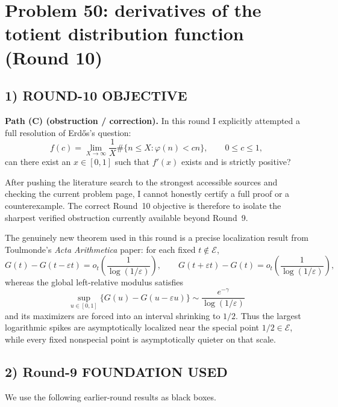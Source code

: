 \section{Problem 50: derivatives of the totient distribution function (Round 10)}

\subsection{1) ROUND-10 OBJECTIVE}

\textbf{Path (C) (obstruction / correction).}
In this round I explicitly attempted a full resolution of Erd\H{o}s's question:
\[
 f(c)=\lim_{X\to\infty}\frac1X\#\{n\le X:\varphi(n)<cn\},
 \qquad 0\le c\le 1,
\]
can there exist an $x\in[0,1]$ such that $f'(x)$ exists and is strictly positive?

After pushing the literature search to the strongest accessible sources and checking the current problem page, I cannot honestly certify a full proof or a counterexample. The correct Round~10 objective is therefore to isolate the sharpest verified obstruction currently available beyond Round~9.

The genuinely new theorem used in this round is a precise localization result from Toulmonde's \emph{Acta Arithmetica} paper: for each fixed $t\notin \mathcal E$,
\[
 G(t)-G(t-\varepsilon t)=o_t\!\left(\frac1{\log(1/\varepsilon)}\right),
 \qquad
 G(t+\varepsilon t)-G(t)=o_t\!\left(\frac1{\log(1/\varepsilon)}\right),
\]
whereas the global left-relative modulus satisfies
\[
 \sup_{u\in[0,1]}\{G(u)-G(u-\varepsilon u)\}
 \sim \frac{e^{-\gamma}}{\log(1/\varepsilon)}
\]
and its maximizers are forced into an interval shrinking to $1/2$.
Thus the largest logarithmic spikes are asymptotically localized near the special point $1/2\in\mathcal E$, while every fixed nonspecial point is asymptotically quieter on that scale.

\subsection{2) Round-9 FOUNDATION USED}

We use the following earlier-round results as black boxes.

